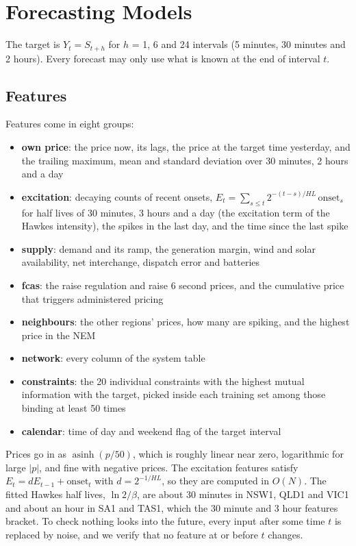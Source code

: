 \chapter{Forecasting Models}\label{ch:forecast}

The target is $Y_t = S_{t+h}$ for $h$ = 1, 6 and 24 intervals (5 minutes, 30 minutes and 2 hours). Every forecast may only use
what is known at the end of interval $t$.

\section{Features}\label{sec:features}
Features come in eight groups:
\begin{itemize}
\item \textbf{own price}: the price now, its lags, the price at the target time yesterday, and the trailing maximum, mean and
standard deviation over 30 minutes, 2 hours and a day
\item \textbf{excitation}: decaying counts of recent onsets, $E_t = \sum_{s \le t} 2^{-(t-s)/HL}\,\text{onset}_s$ for half lives
of 30 minutes, 3 hours and a day (the excitation term of the Hawkes intensity), the spikes in the last day, and the time since the last spike
\item \textbf{supply}: demand and its ramp, the generation margin, wind and solar availability, net interchange, dispatch error and batteries
\item \textbf{fcas}: the raise regulation and raise 6 second prices, and the cumulative price that triggers administered pricing
\item \textbf{neighbours}: the other regions' prices, how many are spiking, and the highest price in the NEM
\item \textbf{network}: every column of the system table
\item \textbf{constraints}: the 20 individual constraints with the highest mutual information with the target, picked inside
each training set among those binding at least 50 times
\item \textbf{calendar}: time of day and weekend flag of the target interval
\end{itemize}
Prices go in as $\operatorname{asinh}(p/50)$, which is roughly linear near zero, logarithmic for large $|p|$, and fine with negative
prices. The excitation features satisfy $E_t = dE_{t-1} + \text{onset}_t$ with $d = 2^{-1/HL}$, so they are computed in $O(N)$.
The fitted Hawkes half lives, $\ln 2/\beta$, are about 30 minutes in NSW1, QLD1 and VIC1 and about an hour in SA1 and TAS1,
which the 30 minute and 3 hour features bracket. To check nothing looks into the future, every input after some time $t$ is
replaced by noise, and we verify that no feature at or before $t$ changes.

